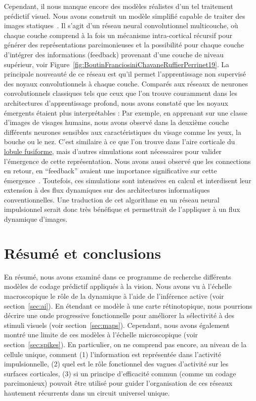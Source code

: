 Cependant, il nous manque encore des modèles réalistes d'un tel
traitement prédictif visuel. Nous avons construit un modèle simplifié
capable de traiter des images statiques~\citep{BoutinFranciosiniChavaneRuffierPerrinet20}. Il s'agit
d'un réseau neural convolutionnel multicouche, où chaque couche comprend à la fois un
mécanisme intra-cortical récursif pour générer des représentations
parcimonieuses et la possibilité pour chaque couche d'intégrer des informations
(feedback) provenant d'une couche de niveau supérieur, voir Figure~\ref{fig:BoutinFranciosiniChavaneRuffierPerrinet19}.
La principale
nouveauté de ce réseau est qu'il permet l'apprentissage non supervisé
des noyaux convolutionnels à chaque couche. Comparés aux réseaux de neurones
convolutionnels classiques tels que ceux que l'on trouve couramment dans les
architectures d'apprentissage profond, nous avons constaté que les
noyaux émergents étaient plus interprétables : Par exemple, en apprenant
sur une classe d'images de visages humains, nous avons observé dans la
deuxième couche différents neurones sensibles aux caractéristiques du
visage comme les yeux, la bouche ou le nez.
C'est similaire à ce que
l'on trouve dans l'aire corticale du \href{https://fr.wikipedia.org/wiki/Lobule_fusiforme}{lobule fusiforme}, mais d'autres simulations
sont nécessaires pour valider l'émergence de cette représentation.
Nous avons aussi observé que les connections en retour, en ``feedback''
avaient une importance significative sur cette émergence~\citep{BoutinFranciosiniRuffierPerrinet20feedback}.
Toutefois, ces simulations sont intensives en calcul et interdisent leur
extension à des flux dynamiques sur des architectures informatiques conventionnelles. Une
traduction de cet algorithme en un réseau neural impulsionnel serait donc
très bénéfique et permettrait de l'appliquer à un flux dynamique
d'images.

\section{Résumé et conclusions}
En résumé, nous avons examiné dans ce programme de recherche différents modèles de
codage prédictif appliqués à la vision. Nous avons vu à l'échelle
macroscopique le rôle de la dynamique à l'aide de l'inférence active
(voir section~\ref{sec:ai}). En étendant ce modèle à une carte rétinotopique, nous
pourrions décrire une onde progressive fonctionnelle pour améliorer la sélectivité à des
stimuli visuels (voir section~\ref{sec:maps}). Cependant, nous avons également montré
une limite de ces modèles à l'échelle microscopique (voir section~\ref{sec:spikes}). En
particulier, on ne comprend pas encore, au niveau de la cellule unique,
comment (1) l'information est représentée dans l'activité impulsionnelle, (2)
quel est le rôle fonctionnel des vagues d'activité sur les surfaces
corticales, (3) si un principe d'efficacité commun (comme un codage
parcimonieux) pouvait être utilisé pour guider l'organisation de ces réseaux
hautement récurrents dans un circuit universel unique.

